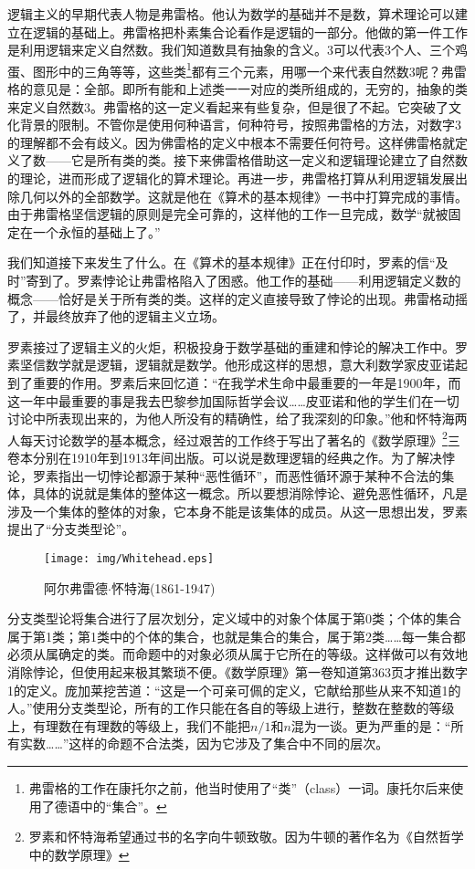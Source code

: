 \documentclass{article}
\begin{document}
逻辑主义的早期代表人物是弗雷格。他认为数学的基础并不是数，算术理论可以建立在逻辑的基础上。弗雷格把朴素集合论看作是逻辑的一部分。他做的第一件工作是利用逻辑来定义自然数。我们知道数具有抽象的含义。3可以代表3个人、三个鸡蛋、图形中的三角等等，这些类\footnote{弗雷格的工作在康托尔之前，他当时使用了“类”（class）一词。康托尔后来使用了德语中的“集合”。}都有三个元素，用哪一个来代表自然数3呢？弗雷格的意见是：全部。即所有能和上述类一一对应的类所组成的，无穷的，抽象的类来定义自然数3。弗雷格的这一定义看起来有些复杂，但是很了不起。它突破了文化背景的限制。不管你是使用何种语言，何种符号，按照弗雷格的方法，对数字3的理解都不会有歧义。因为佛雷格的定义中根本不需要任何符号。这样佛雷格就定义了数——它是所有类的类。接下来佛雷格借助这一定义和逻辑理论建立了自然数的理论，进而形成了逻辑化的算术理论。再进一步，弗雷格打算从利用逻辑发展出除几何以外的全部数学。这就是他在《算术的基本规律》一书中打算完成的事情。由于弗雷格坚信逻辑的原则是完全可靠的，这样他的工作一旦完成，数学“就被固定在一个永恒的基础上了。”

我们知道接下来发生了什么。在《算术的基本规律》正在付印时，罗素的信“及时”寄到了。罗素悖论让弗雷格陷入了困惑。他工作的基础——利用逻辑定义数的概念——恰好是关于所有类的类。这样的定义直接导致了悖论的出现。弗雷格动摇了，并最终放弃了他的逻辑主义立场。

罗素接过了逻辑主义的火炬，积极投身于数学基础的重建和悖论的解决工作中。罗素坚信数学就是逻辑，逻辑就是数学。他形成这样的思想，意大利数学家皮亚诺起到了重要的作用。罗素后来回忆道：“在我学术生命中最重要的一年是1900年，而这一年中最重要的事是我去巴黎参加国际哲学会议……皮亚诺和他的学生们在一切讨论中所表现出来的，为他人所没有的精确性，给了我深刻的印象。”他和怀特海两人每天讨论数学的基本概念，经过艰苦的工作终于写出了著名的《数学原理》\footnote{罗素和怀特海希望通过书的名字向牛顿致敬。因为牛顿的著作名为《自然哲学中的数学原理》}三卷本分别在1910年到1913年间出版。可以说是数理逻辑的经典之作。为了解决悖论，罗素指出一切悖论都源于某种“恶性循环”，而恶性循环源于某种不合法的集体，具体的说就是集体的整体这一概念。所以要想消除悖论、避免恶性循环，凡是涉及一个集体的整体的对象，它本身不能是该集体的成员。从这一思想出发，罗素提出了“分支类型论”。

\begin{wrapfigure}{R}{0.4\textwidth}
 \centering
 \texttt{[image: img/Whitehead.eps]}
 \captionsetup{labelformat=empty}
 \caption{阿尔弗雷德$\cdot$怀特海(1861-1947)}
 \label{fig:Whitehead}
\end{wrapfigure}

分支类型论将集合进行了层次划分，定义域中的对象个体属于第0类；个体的集合属于第1类；第1类中的个体的集合，也就是集合的集合，属于第2类……每一集合都必须从属确定的类。而命题中的对象必须从属于它所在的等级。这样做可以有效地消除悖论，但使用起来极其繁琐不便。《数学原理》第一卷知道第363页才推出数字1的定义。庞加莱挖苦道：“这是一个可亲可佩的定义，它献给那些从来不知道1的人。”使用分支类型论，所有的工作只能在各自的等级上进行，整数在整数的等级上，有理数在有理数的等级上，我们不能把$n/1$和$n$混为一谈。更为严重的是：“所有实数……”这样的命题不合法类，因为它涉及了集合中不同的层次。
\end{document}
